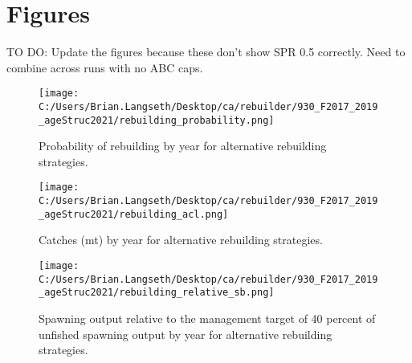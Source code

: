 \documentclass[11pt,
  english,
  a4paper,
]{article}
\begin{document}
\clearpage

\clearpage


\hypertarget{figures}{%
\section{Figures}\label{figures}}

\leavevmode\tagmcend\tagstructend


TO DO: Update the figures because these don't show SPR 0.5 correctly. Need to combine across runs with no ABC caps.

\leavevmode\tagmcend\tagstructend\par


\begin{figure}
\centering
\texttt{[image: C:/Users/Brian.Langseth/Desktop/ca/rebuilder/930\_F2017\_2019\_ageStruc2021/rebuilding\_probability.png]}
\caption{Probability of rebuilding by year for alternative rebuilding strategies.\label{fig:prob-fig}}
\end{figure}

\tagmcend\tagstructend


\begin{figure}
\centering
\texttt{[image: C:/Users/Brian.Langseth/Desktop/ca/rebuilder/930\_F2017\_2019\_ageStruc2021/rebuilding\_acl.png]}
\caption{Catches (mt) by year for alternative rebuilding strategies.\label{fig:acl-fig}}
\end{figure}

\tagmcend\tagstructend


\begin{figure}
\centering
\texttt{[image: C:/Users/Brian.Langseth/Desktop/ca/rebuilder/930\_F2017\_2019\_ageStruc2021/rebuilding\_relative\_sb.png]}
\caption{Spawning output relative to the management target of 40 percent of unfished spawning output by year for alternative rebuilding strategies.\label{fig:rel-ssb-fig}}
\end{figure}
\end{document}
